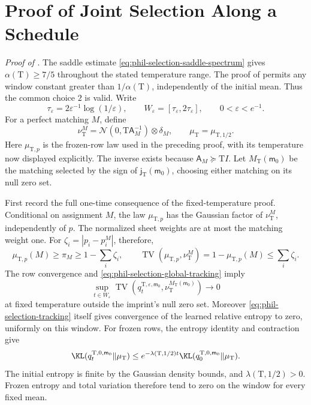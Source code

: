 \section{Proof of Joint Selection Along a Schedule}
\label{sec:phil-joint-selection-proof}

\noindent\emph{Proof of .}
The saddle estimate \cref{eq:phil-selection-saddle-spectrum} gives
\(\alpha(\mathrm T)\ge7/5\) throughout the stated temperature range.
The proof of  permits any window
constant greater than \(1/\alpha(\mathrm T)\), independently of the
initial mean. Thus the common choice \(2\) is valid. Write
\[
 \tau_\varepsilon=2\varepsilon^{-1}\log(1/\varepsilon),
 \qquad W_\varepsilon=[\tau_\varepsilon,2\tau_\varepsilon],
 \qquad 0<\varepsilon<e^{-1}.
\]
For a perfect matching \(M\), define
\[
 \nu_{\mathrm T}^M
 =\mathcal N(0,\mathrm T\mathsf A_M^{-1})\otimes\delta_M,
 \qquad
 \mu_{\mathrm T}=\mu_{\mathrm T,1/2}.
\]
Here \(\mu_{\mathrm T,p}\) is the frozen-row law used in the preceding
proof, with its temperature now displayed explicitly. The inverse
exists because \(\mathsf A_M\succeq\mathrm TI\). Let
\(M_{\mathrm T}(\mathsf m_0)\) be the matching selected by the sign of
\(\mathsf j_{\mathrm T}(\mathsf m_0)\), choosing either matching on its
null zero set.

First record the full one-time consequence of the fixed-temperature
proof. Conditional on assignment \(M\), the law
\(\mu_{\mathrm T,p}\) has the Gaussian factor of \(\nu_{\mathrm T}^M\),
independently of \(p\). The normalized sheet weights are at most the
matching weight one. For
\(\zeta_i=|p_i-p_i^M|\), therefore,
\[
 \mu_{\mathrm T,p}(M)\ge\pi_M\ge1-\sum_i\zeta_i,
 \qquad
 \operatorname{TV}(\mu_{\mathrm T,p},\nu_{\mathrm T}^M)
 =1-\mu_{\mathrm T,p}(M)\le\sum_i\zeta_i.
\]
The row convergence and
\cref{eq:phil-selection-global-tracking} imply
\[
 \sup_{t\in W_\varepsilon}
 \operatorname{TV}
 (q_t^{\mathrm T,\varepsilon,\mathsf m_0},
       \nu_{\mathrm T}^{M_{\mathrm T}(\mathsf m_0)})
 \longrightarrow0
\]
at fixed temperature outside the imprint's null zero set.
Moreover \cref{eq:phil-selection-tracking} itself gives convergence
of the learned relative entropy to zero, uniformly on this window.
For frozen rows, the entropy identity and contraction give
\[
 \KL(q_t^{\mathrm T,0,\mathsf m_0}\Vert\mu_{\mathrm T})
 \le e^{-\lambda(\mathrm T,1/2)t}
       \KL(q_0^{\mathrm T,0,\mathsf m_0}\Vert\mu_{\mathrm T}).
\]
The initial entropy is finite by the Gaussian density bounds, and
\(\lambda(\mathrm T,1/2)>0\). Frozen entropy and total variation
therefore tend to zero on the window for every fixed mean.

